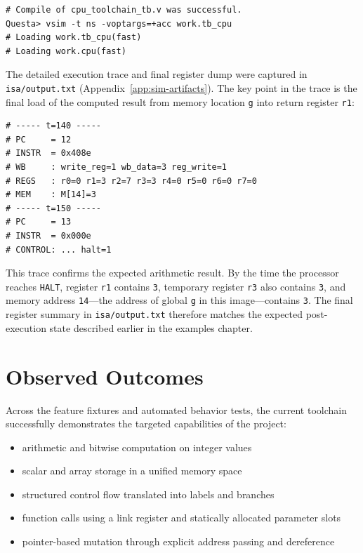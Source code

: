 \documentclass[12pt]{report}
\begin{document}
\begin{center}
\begin{minipage}{0.88\textwidth}
\begin{lstlisting}
# Compile of cpu_toolchain_tb.v was successful.
Questa> vsim -t ns -voptargs=+acc work.tb_cpu
# Loading work.tb_cpu(fast)
# Loading work.cpu(fast)
\end{lstlisting}
\end{minipage}
\end{center}

The detailed execution trace and final register dump were captured in
\texttt{isa/output.txt} (Appendix~\ref{app:sim-artifacts}). The key point in
the trace is the final load of the computed result from memory location
\texttt{g} into return register \texttt{r1}:

\begin{center}
\begin{minipage}{0.88\textwidth}
\begin{lstlisting}
# ----- t=140 -----
# PC     = 12
# INSTR  = 0x408e
# WB     : write_reg=1 wb_data=3 reg_write=1
# REGS   : r0=0 r1=3 r2=7 r3=3 r4=0 r5=0 r6=0 r7=0
# MEM    : M[14]=3
# ----- t=150 -----
# PC     = 13
# INSTR  = 0x000e
# CONTROL: ... halt=1
\end{lstlisting}
\end{minipage}
\end{center}

This trace confirms the expected arithmetic result. By the time the processor
reaches \texttt{HALT}, register \texttt{r1} contains \texttt{3}, temporary
register \texttt{r3} also contains \texttt{3}, and memory address
\texttt{14}---the address of global \texttt{g} in this image---contains
\texttt{3}. The final register summary in \texttt{isa/output.txt} therefore
matches the expected post-execution state described earlier in the examples
chapter.

\section{Observed Outcomes}

Across the feature fixtures and automated behavior tests, the current toolchain
successfully demonstrates the targeted capabilities of the project:

\begin{itemize}
    \item arithmetic and bitwise computation on integer values
    \item scalar and array storage in a unified memory space
    \item structured control flow translated into labels and branches
    \item function calls using a link register and statically allocated parameter slots
    \item pointer-based mutation through explicit address passing and dereference
\end{itemize}
\end{document}
